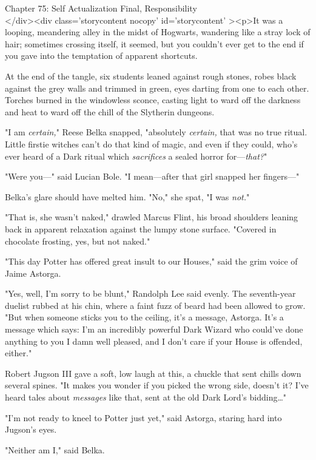 
Chapter 75: Self Actualization Final, Responsibility\\
</div><div  class='storycontent nocopy' id='storycontent' ><p>It was a looping, 
meandering alley in the midst of Hogwarts, wandering like a stray lock of hair; 
sometimes crossing itself, it seemed, but you couldn't ever get to the end if 
you gave into the temptation of apparent shortcuts.

At the end of the tangle, six students leaned against rough stones, robes black 
against the grey walls and trimmed in green, eyes darting from one to each 
other. Torches burned in the windowless sconce, casting light to ward off the 
darkness and heat to ward off the chill of the Slytherin dungeons.

"I am \emph{certain,}" Reese Belka snapped, "absolutely \emph{certain,} that 
was no true ritual. Little firstie witches can't do that kind of magic, and 
even if they could, who's ever heard of a Dark ritual which \emph{sacrifices} a 
sealed horror for---\emph{that?}"

"Were you---" said Lucian Bole. "I mean---after that girl snapped her 
fingers---"

Belka's glare should have melted him. "No," she spat, "I was \emph{not.}"

"That is, she wasn't naked," drawled Marcus Flint, his broad shoulders leaning 
back in apparent relaxation against the lumpy stone surface. "Covered in 
chocolate frosting, yes, but not naked."

"This day Potter has offered great insult to our Houses," said the grim voice 
of Jaime Astorga.

"Yes, well, I'm sorry to be blunt," Randolph Lee said evenly. The seventh-year 
duelist rubbed at his chin, where a faint fuzz of beard had been allowed to 
grow. "But when someone sticks you to the ceiling, it's a message, Astorga. 
It's a message which says: I'm an incredibly powerful Dark Wizard who could've 
done anything to you I damn well pleased, and I don't care if your House is 
offended, either."

Robert Jugson III gave a soft, low laugh at this, a chuckle that sent chills 
down several spines. "It makes you wonder if you picked the wrong side, doesn't 
it? I've heard tales about \emph{messages} like that, sent at the old Dark 
Lord's bidding{\ldots}"

"I'm not ready to kneel to Potter just yet," said Astorga, staring hard into 
Jugson's eyes.

"Neither am I," said Belka.

